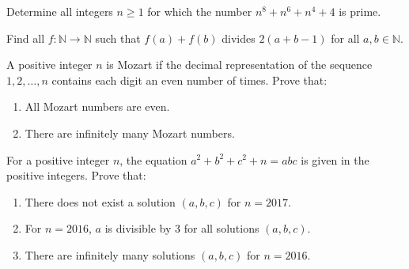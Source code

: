 \documentclass[problems.tex]{subfile}
\begin{document}
	
	
	\begin{problem}
		Determine all integers $n\ge1$ for which the number $n^8+n^6+n^4+4$ is prime. %
	\end{problem}
	
	
	
	
	\begin{problem}
		Find all $f : \mathbb{N} \to \mathbb{N} $ such that $f(a) + f(b)$ divides $2(a + b - 1)$ for all $a, b \in \mathbb{N}$. %
	\end{problem}
	
	
	
	
	
	\begin{problem}
		A positive integer $n$ is Mozart if the decimal representation of the sequence $1, 2, \ldots, n$ contains each digit an even number of times.
		Prove that:
		\begin{enumerate}
			\item All Mozart numbers are even.
			\item There are infinitely many Mozart numbers.
		\end{enumerate}
	\end{problem}
	
	
	
	
	\begin{problem}
		For a positive integer $n$, the equation $a^2 + b^2 + c^2 + n = abc$ is given in the positive integers.
		Prove that:
		\begin{enumerate}
			\item There does not exist a solution $(a, b, c)$ for $n = 2017$.
			\item For $n = 2016$, $a$ is divisible by $3$ for all solutions $(a, b, c)$.
			\item There are infinitely many solutions $(a, b, c)$ for $n = 2016$.
		\end{enumerate}
	\end{problem}
	
	
	
\end{document}
